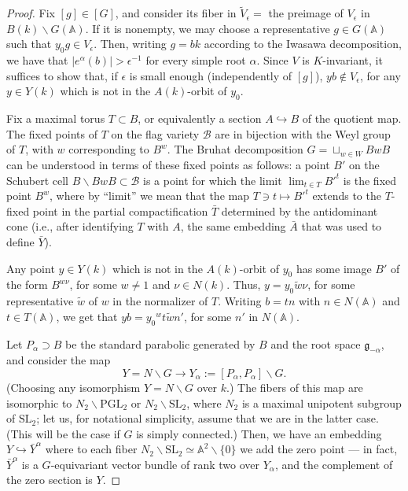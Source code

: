 \begin{proof}
 
 Fix $[g]\in [G]$, and consider its fiber in $\tilde V_\epsilon=$ the preimage of $V_\epsilon$ in $B(k)\backslash G(\mathbb A)$. If it is nonempty, we may choose a representative $g\in G(\mathbb A)$ such that $y_0 g \in V_\epsilon$. Then, writing $g = bk$ according to the Iwasawa decomposition, we have that $|e^\alpha(b)|>\epsilon^{-1}$ for every simple root $\alpha$. Since $V$ is $K$-invariant, it suffices to show that, if $\epsilon$ is small enough (independently of $[g]$), $y b \notin V_\epsilon$, for any $y\in Y(k)$ which is not in the $A(k)$-orbit of $y_0$. 
 
Fix a maximal torus $T\subset B$, or equivalently a section $A\hookrightarrow B$ of the quotient map. 
The fixed points of $T$ on the flag variety $\mathcal B$ are in bijection with the Weyl group of $T$, with $w$ corresponding to $B^w$. The Bruhat decomposition $G = \sqcup_{w\in W} BwB$ can be understood in terms of these fixed points as follows: a point $B'$ on the Schubert cell $B\backslash BwB\subset \mathcal B$ is a point for which the limit $\lim_{t\in T} B'^t$ is the fixed point $B^w$, where by ``limit'' we mean that the map $T\ni t \mapsto B'^t$ extends to the $T$-fixed point in the partial compactification $\bar T$ determined by the antidominant cone (i.e., after identifying $T$ with $A$, the same embedding $\bar A$ that was used to define $\bar Y$). 

Any point $y\in Y(k)$ which is not in the $A(k)$-orbit of $y_0$ has some image $B'$ of the form $B^{w \nu}$, for some $w\ne 1$ and $\nu \in N(k)$. Thus, $y = y_0 \tilde w \nu$, for some representative $\tilde w$ of $w$ in the normalizer of $T$. Writing $b=tn$ with $n\in N(\mathbb A)$ and $t\in T(\mathbb A)$, we get that $yb = y_0 {^wt} \tilde w n'$, for some $n'$ in $N(\mathbb A)$. 

Let $P_\alpha \supset B$ be the standard parabolic generated by $B$ and the root space $\mathfrak g_{-\alpha}$, and consider the map 
$$ Y = N\backslash G \to Y_{\alpha}:= [P_\alpha,P_\alpha]\backslash G.$$
(Choosing any isomorphism $Y=N\backslash G$ over $k$.) The fibers of this map are isomorphic to $N_2\backslash \text{PGL}_2$ or $N_2\backslash \text{SL}_2$, where $N_2$ is a maximal unipotent subgroup of $\text{SL}_2$; let us, for notational simplicity, assume that we are in the latter case. (This will be the case if $G$ is simply connected.) Then, we have an embedding $Y\hookrightarrow \bar Y^\alpha$ where to each fiber $N_2\backslash \text{SL}_2 \simeq \mathbb A^2\smallsetminus\{0\}$ we add the zero point --- in fact, $\bar Y^\alpha$ is a $G$-equivariant vector bundle of rank two over $Y_\alpha$, and the complement of the zero section is $Y$. 


\end{proof}
